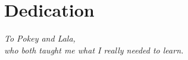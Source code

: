 \chapter{Dedication}

\vspace*{\fill}

\begin{center}
\textit{%
To Pokey and Lala, \\
who both taught me what I really needed to learn.
}
\end{center}

\vspace{1in}

\begin{center}
\Heart\quad\Heart\quad\Heart
\end{center}

\vspace*{\fill}

